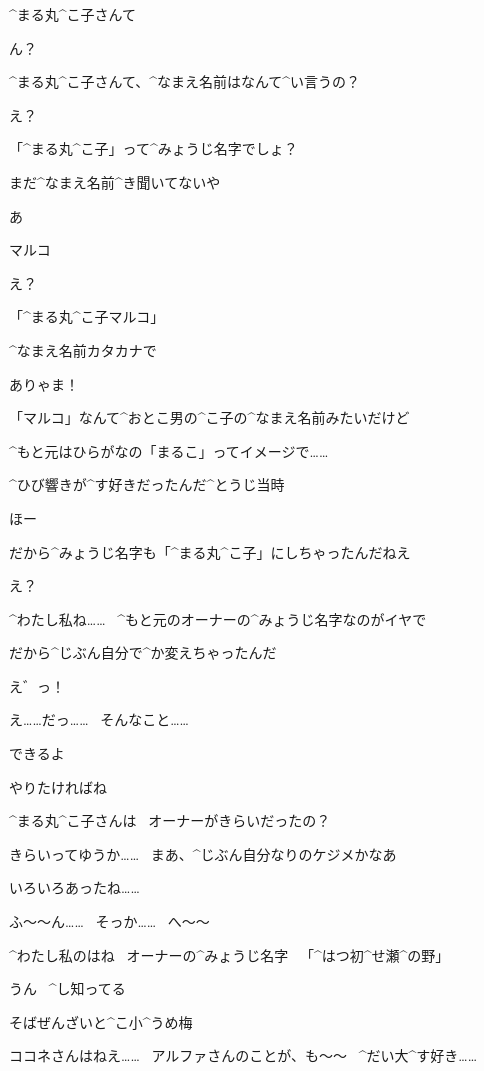 \page[110]
\Alpha ^{まる}{丸}^{こ}{子}さんて

\Maruko ん？

\Alpha ^{まる}{丸}^{こ}{子}さんて、^{なまえ}{名前}はなんて^{い}{言}うの？

\Maruko え？

\Alpha 「^{まる}{丸}^{こ}{子}」って^{みょうじ}{名字}でしょ？

\Alpha まだ^{なまえ}{名前}^{き}{聞}いてないや

\Maruko あ

\Maruko マルコ

\Alpha え？

\page[111]
\Maruko 「^{まる}{丸}^{こ}{子}マルコ」

\Maruko ^{なまえ}{名前}カタカナで

\Alpha ありゃま！

\Maruko 「マルコ」なんて^{おとこ}{男}の^{こ}{子}の^{なまえ}{名前}みたいだけど

\Maruko ^{もと}{元}はひらがなの「まるこ」ってイメージで……

\Maruko ^{ひび}{響}きが^{す}{好}きだったんだ^{とうじ}{当時}

\Alpha ほー

\Maruko だから^{みょうじ}{名字}も「^{まる}{丸}^{こ}{子}」にしちゃったんだねえ

\Alpha え？

\page[112]
\Maruko ^{わたし}{私}ね……
\ ^{もと}{元}のオーナーの^{みょうじ}{名字}なのがイヤで

\Maruko だから^{じぶん}{自分}で^{か}{変}えちゃったんだ

\Alpha え゛っ！

\Alpha え……だっ……
\ そんなこと……

\Maruko できるよ

\Maruko やりたければね

\page[113]
\Alpha ^{まる}{丸}^{こ}{子}さんは
\ オーナーがきらいだったの？

\Maruko きらいってゆうか……
\ まあ、^{じぶん}{自分}なりのケジメかなあ

\Maruko いろいろあったね……

\Alpha ふ〜〜ん……
\ そっか……
\ へ〜〜

\Alpha ^{わたし}{私}のはね
\ オーナーの^{みょうじ}{名字}
\ 「^{はつ}{初}^{せ}{瀬}^{の}{野}」

\Maruko うん
\ ^{し}{知}ってる

\page[114]
\Sign そばぜんざいと^{こ}{小}^{うめ}{梅}

\Maruko ココネさんはねえ……
\ アルファさんのことが、も〜〜
\ ^{だい}{大}^{す}{好}き……

